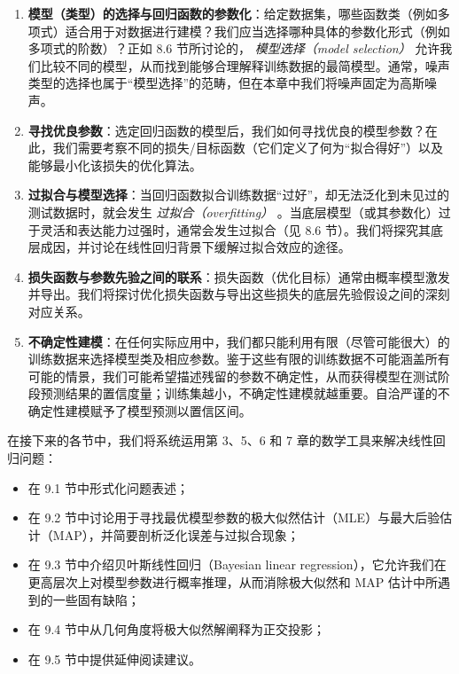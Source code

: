 \begin{enumerate}
\item \textbf{模型（类型）的选择与回归函数的参数化}：给定数据集，哪些函数类（例如多项式）适合用于对数据进行建模？我们应当选择哪种具体的参数化形式（例如多项式的阶数）？正如 8.6 节所讨论的， \emph{模型选择（model selection）} 允许我们比较不同的模型，从而找到能够合理解释训练数据的最简模型。通常，噪声类型的选择也属于“模型选择”的范畴，但在本章中我们将噪声固定为高斯噪声。
\item \textbf{寻找优良参数}：选定回归函数的模型后，我们如何寻找优良的模型参数？在此，我们需要考察不同的损失/目标函数（它们定义了何为“拟合得好”）以及能够最小化该损失的优化算法。
\item \textbf{过拟合与模型选择}：当回归函数拟合训练数据“过好”，却无法泛化到未见过的测试数据时，就会发生 \emph{过拟合（overfitting）} 。当底层模型（或其参数化）过于灵活和表达能力过强时，通常会发生过拟合（见 8.6 节）。我们将探究其底层成因，并讨论在线性回归背景下缓解过拟合效应的途径。
\item \textbf{损失函数与参数先验之间的联系}：损失函数（优化目标）通常由概率模型激发并导出。我们将探讨优化损失函数与导出这些损失的底层先验假设之间的深刻对应关系。
\item \textbf{不确定性建模}：在任何实际应用中，我们都只能利用有限（尽管可能很大）的训练数据来选择模型类及相应参数。鉴于这些有限的训练数据不可能涵盖所有可能的情景，我们可能希望描述残留的参数不确定性，从而获得模型在测试阶段预测结果的置信度量；训练集越小，不确定性建模就越重要。自洽严谨的不确定性建模赋予了模型预测以置信区间。
\end{enumerate}

在接下来的各节中，我们将系统运用第 3、5、6 和 7 章的数学工具来解决线性回归问题：

\begin{itemize}
\item 在 9.1 节中形式化问题表述；
\item 在 9.2 节中讨论用于寻找最优模型参数的极大似然估计（MLE）与最大后验估计（MAP），并简要剖析泛化误差与过拟合现象；
\item 在 9.3 节中介绍贝叶斯线性回归（Bayesian linear regression），它允许我们在更高层次上对模型参数进行概率推理，从而消除极大似然和 MAP 估计中所遇到的一些固有缺陷；
\item 在 9.4 节中从几何角度将极大似然解阐释为正交投影；
\item 在 9.5 节中提供延伸阅读建议。
\end{itemize}
